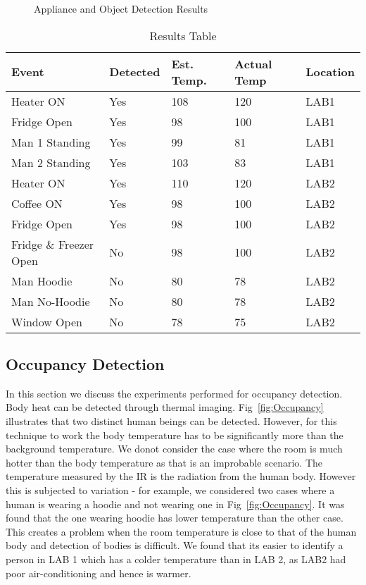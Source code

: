  \begin{figure}[!ht]
 	\label{fig:Object Detection}
 	\caption{Appliance and Object Detection Results}
 \end{figure}
    
    \begin{table}[h!]
    	\centering
    	\begin{tabular}{||p{1.8cm} | p{1.2cm} | p{1.2cm}| p{1cm} | p{1cm}||}
    		\hline
    		Event & Detected & Est. Temp. & Actual Temp & Location\\ [0.5ex]
    		\hline\hline
    			Heater ON  & Yes & 108 &  120 & LAB1\\
    			\hline
    			 Fridge Open  & Yes & 98 &  100 & LAB1\\
    			 \hline
    			 Man 1 Standing  & Yes & 99 &  81 & LAB1\\
    			\hline
    				 Man 2 Standing  & Yes & 103 &  83  & LAB1\\
    				 \hline
    		 Heater ON  & Yes & 110 &  120 & LAB2\\
    		\hline
		     Coffee ON  & Yes & 98 &  100 & LAB2\\
    		\hline
    		 Fridge Open  & Yes & 98 &  100 & LAB2\\
    		\hline
    		Fridge \& Freezer Open  & No & 98 &  100 & LAB2\\
    		\hline
    		Man Hoodie  & No & 80 &  78 & LAB2\\
    		\hline
    		Man No-Hoodie & No & 80 &  78 & LAB2\\
    		\hline
    		Window Open & No & 78 &  75 & LAB2\\
    		\hline\hline
     	\end{tabular}
    	\label{table:DetectionTable}
    	\caption{Results Table}
    \end{table}
    
    
     \subsection{Occupancy Detection} 
     
     In this section we discuss the experiments performed for occupancy detection. Body heat can be detected through thermal imaging. Fig~\ref{fig:Occupancy} illustrates that two distinct human beings can be detected. However, for this technique to work the body temperature has to be significantly more than the background temperature. We donot consider the case where the room is much hotter than the body temperature as that is an improbable scenario. The temperature measured by the IR is the radiation from the human body. However this is subjected to variation - for example, we considered two cases where a human is wearing a hoodie and not wearing one in Fig~\ref{fig:Occupancy}. It was found that the one wearing hoodie has lower temperature than the other case. This creates a problem when the room temperature is close to that of the human body and detection of bodies is difficult. We found that its easier to identify a person in LAB 1 which has a colder temperature than in LAB 2, as LAB2 had poor air-conditioning and hence is warmer. 



